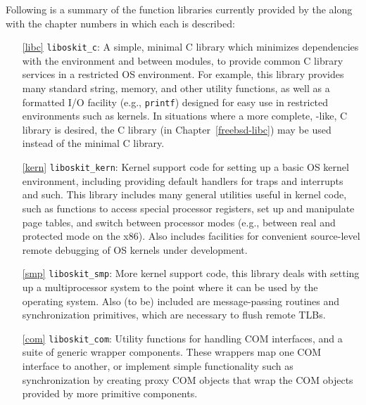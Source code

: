 Following is a summary of
the function libraries currently provided by the \oskit{}
along with the chapter numbers in which each is described:
\begin{itemize}
\item[\ref{libc}]	{\tt liboskit_c}:
	A simple, minimal C library
	which minimizes dependencies with the environment and between modules,
	to provide common C library services in a restricted OS environment.
	For example, this library provides
	many standard string, memory, and other utility functions,
	as well as a formatted I/O facility (e.g., {\tt printf})
	designed for easy use in restricted environments such as
	kernels. In situations where a more complete, \posix{}-like, C
        library is desired, the \freebsd{} C library (in
	Chapter~\ref{freebsd-libc}) may be used instead of the minimal
	C library.

\item[\ref{kern}]	{\tt liboskit_kern}:
	Kernel support code for setting up a basic OS kernel environment,
	including providing default handlers for traps and interrupts and such.
	This library includes many general utilities useful in kernel code,
	such as functions to access special processor registers,
	set up and manipulate page tables, and switch between processor modes
	(e.g., between real and protected mode on the x86).
	Also includes facilities for convenient source-level remote debugging
	of OS kernels under development.

\item[\ref{smp}]	{\tt liboskit_smp}:
	More kernel support code, this library deals with setting up
	a multiprocessor system to the point where it can be used by
	the operating system.
	Also (to be) included are message-passing routines and
	synchronization primitives, which are necessary to flush
	remote TLBs.

%
\item[\ref{com}]	{\tt liboskit_com}:
	Utility functions for handling COM interfaces, and a suite
	of generic wrapper components.  These wrappers map one \oskit{} COM
	interface to another, or implement simple functionality such as
	synchronization by creating proxy COM objects that wrap the
	COM objects provided by more primitive components.


\end{itemize}
